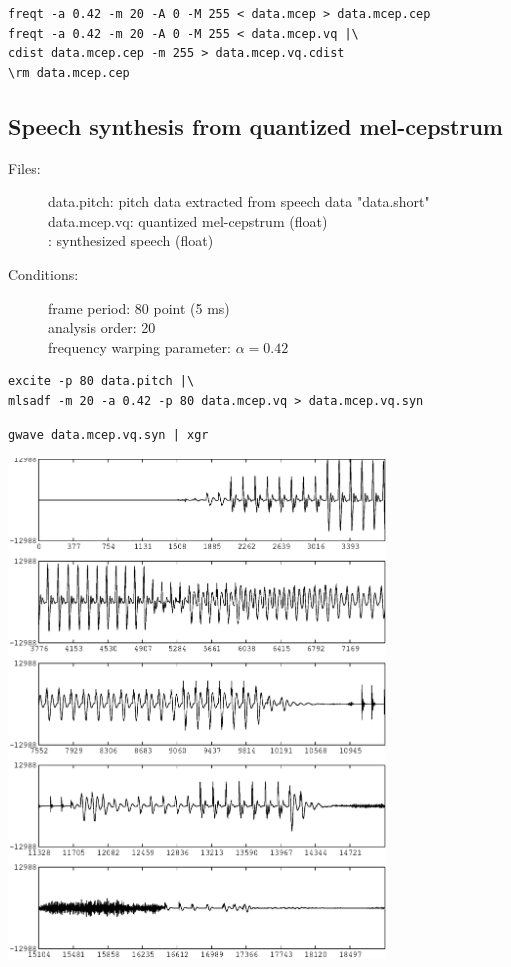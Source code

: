 \documentclass[a4paper]{article}
\begin{document}
\begin{verbatim}
freqt -a 0.42 -m 20 -A 0 -M 255 < data.mcep > data.mcep.cep
freqt -a 0.42 -m 20 -A 0 -M 255 < data.mcep.vq |\
cdist data.mcep.cep -m 255 > data.mcep.vq.cdist
\rm data.mcep.cep
\end{verbatim}

\subsection{Speech synthesis from quantized mel-cepstrum}

\begin{description}
\item[Files:]
  data.pitch: pitch data extracted from speech data "data.short"\\
  data.mcep.vq: quantized mel-cepstrum (float) \\
  : 
  synthesized speech (float)
\item[Conditions:]
  frame period: 80 point (5 ms)\\
  analysis order: 20 \\
  frequency warping parameter: $\alpha = 0.42$
\end{description}

\begin{verbatim}
excite -p 80 data.pitch |\
mlsadf -m 20 -a 0.42 -p 80 data.mcep.vq > data.mcep.vq.syn
\end{verbatim}

\begin{verbatim}
gwave data.mcep.vq.syn | xgr
\end{verbatim}

\includegraphics[width=10cm]{data.mcep.vq.syn.gwave.eps}
\end{document}
